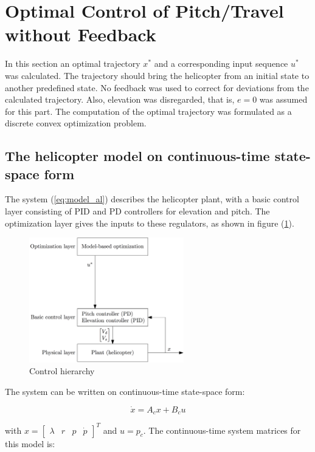 \section{Optimal Control of Pitch/Travel without Feedback}\label{sec:prob2}

In this section an optimal trajectory $x^*$ and a corresponding input sequence $u^*$ was calculated. The trajectory should bring the helicopter from an initial state to another predefined state. No feedback was used to correct for deviations from the calculated trajectory. Also, elevation was disregarded, that is, $e=0$ was assumed for this part. The computation of the optimal trajectory was formulated as a discrete convex optimization problem.


\subsection{The helicopter model on continuous-time state-space form}

The system (\ref{eq:model_al}) describes the helicopter plant, with a basic control layer consisting of PID and PD controllers for elevation and pitch. The optimization layer gives the inputs to these regulators, as shown in figure (\ref{fig:control_hierarchy}).

\begin{figure}[ht]
	\centering
	\includegraphics[width=0.6\textwidth]{figures/control_hierarchy_day2}
	\caption{Control hierarchy}
	\label{fig:control_hierarchy}
\end{figure}

The system can be written on continuous-time state-space form:

\begin{equation}
    \dot{x} = A_cx + B_cu
    \label{eq:state_space_axbu}
\end{equation}

with $x = \begin{bmatrix} \lambda & r & p & \dot{p} \end{bmatrix}^T$ and $u = p_c$.
The continuous-time system matrices for this model is:

